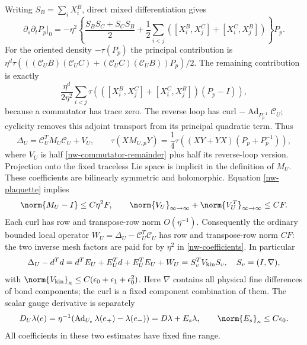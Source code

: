 Writing $S_B=\sum_iX_i^B$, direct mixed differentiation gives
\begin{equation}\label{nw-mixed}
 \partial_s\partial_tP_p\big|_0=-\eta^2
 \left\{\frac{S_BS_C+S_CS_B}{2}
 +\frac12\sum_{i<j}
 ([X_i^B,X_j^C]+[X_i^C,X_j^B])\right\}P_p.
\end{equation}
For the oriented density $-\tau(P_p)$ the principal contribution is
$\eta^d\tau(((\mathcal C_UB)(\mathcal C_UC)
+(\mathcal C_UC)(\mathcal C_UB))P_p)/2$.
The remaining contribution is exactly
\begin{equation}\label{nw-commutator-remainder}
 \frac{\eta^d}{2\eta^2}\sum_{i<j}
 \tau\left(([X_i^B,X_j^C]+[X_i^C,X_j^B])(P_p-I)\right),
\end{equation}
because a commutator has trace zero. The reverse loop has curl
$-\operatorname{Ad}_{P_p^{-1}}\mathcal C_U$; cyclicity removes this
adjoint transport from its principal quadratic term. Thus
\begin{equation}\label{nw-hessian}
 \Delta_U=\mathcal C_U^TM_U\mathcal C_U+V_U,\qquad
 \tau(XM_{U,p}Y)=\frac14\tau((XY+YX)(P_p+P_p^{-1})),
\end{equation}
where $V_U$ is half \eqref{nw-commutator-remainder} plus half its
reverse-loop version. Projection onto the fixed traceless Lie space
is implicit in the definition of $M_U$. These coefficients are
bilinearly symmetric and holomorphic. Equation \eqref{nw-plaquette}
implies
\begin{equation}\label{nw-coefficients}
 \norm{M_U-I}\le C\eta^2F,
 \qquad \norm{V_U}_{\infty\to\infty}
       +\norm{V_U^T}_{\infty\to\infty}\le CF.
\end{equation}
Each curl has row and transpose-row norm $O(\eta^{-1})$.
Consequently the ordinary bounded local operator
$W_U=\Delta_U-\mathcal C_U^T\mathcal C_U$ has row and
transpose-row norm $CF$: the two inverse mesh factors are paid for
by $\eta^2$ in \eqref{nw-coefficients}. In particular
\begin{equation}\label{nw-small-form}
 \Delta_U-d^Td=d^TE_U+E_U^Td+E_U^TE_U+W_U
       =S_v^TV_{\rm kin}S_v,
 \quad S_v=(I,\nabla),
\end{equation}
with $\norm{V_{\rm kin}}_\kappa\le
C(\epsilon_0+\epsilon_1+\epsilon_0^2)$.
Here $\nabla$ contains all physical fine differences of bond
components; the curl is a fixed component combination of them.
The scalar gauge derivative is separately
\begin{equation}\label{nw-scalar-gradient}
 D_U\lambda(e)=\eta^{-1}
  (\operatorname{Ad}_{U_e}\lambda(e_+)-\lambda(e_-))
  =D\lambda+E_s\lambda,
 \qquad \norm{E_s}_\kappa\le C\epsilon_0.
\end{equation}
All coefficients in these two estimates have fixed fine range.

